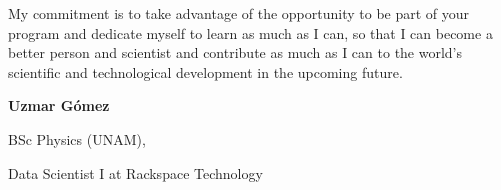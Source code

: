 \documentclass{article}
\begin{document}
My commitment is to take advantage of the opportunity to be part of your program and dedicate myself to learn as much as I can, so that I can become a better person and scientist and contribute as much as I can to the world’s scientific and technological development in the upcoming future.

\vspace{4cm}
\hfill \textbf{Uzmar Gómez}

\hfill BSc Physics (UNAM), 

\hfill Data Scientist I at Rackspace Technology
\end{document}
